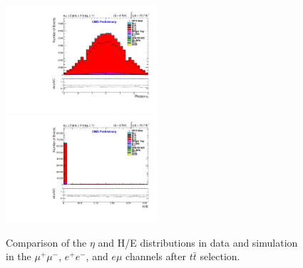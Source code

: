 \documentclass[oneside, a4paper, 11pt, ]{report}
\begin{document}
\begin{figure}
\includegraphics[width=0.5\textwidth]{Plots/ControlPlots/TTbarDiLeptonAnalysis/EMu/Photons/AllPhotons/Photon_Eta_splitTTbar_ratio.pdf}
\includegraphics[width=0.5\textwidth]{Plots/ControlPlots/TTbarDiLeptonAnalysis/EMu/Photons/AllPhotons/Photon_HtowoE_splitTTbar_ratio.pdf}
\caption{Comparison of the $\eta$ and H/E distributions in data and simulation in the $\mu^{+}\mu^{-}$, $e^{+}e^{-}$, and $e\mu$ channels after $t\bar{t}$ selection.}
\label{fig-ttbarEtaAndHoverE}
\end{figure}
\end{document}
